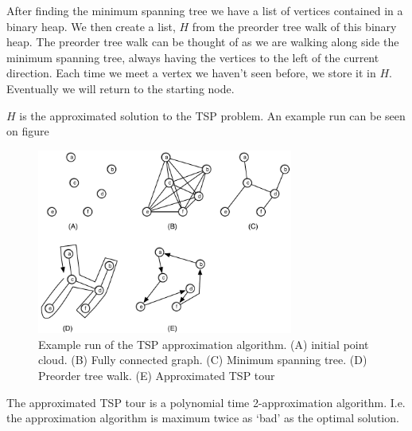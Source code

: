 \documentclass[10pt]{article}
\begin{document}
After finding the minimum spanning tree we have a list of vertices contained in a binary heap. We then create a list, $H$ from the preorder tree walk of this binary heap. The preorder tree walk can be thought of as we are walking along side the minimum spanning tree, always having the vertices to the left of the current direction. Each time we meet a vertex we haven't seen before, we store it in $H$. Eventually we will return to the starting node. 

$H$ is the approximated solution to the TSP problem. An example run can be seen on figure

\begin{figure}[ht]
\centering
\includegraphics[width=0.75\textwidth]{figures/fig14.pdf}
\caption{Example run of the TSP approximation algorithm. (A) initial point cloud. (B) Fully connected graph. (C) Minimum spanning tree. (D) Preorder tree walk. (E) Approximated TSP tour}
\label{fig14}
\end{figure}


The approximated TSP tour is a polynomial time 2-approximation algorithm. I.e. the approximation algorithm is maximum twice as `bad' as the optimal solution.
\end{document}
